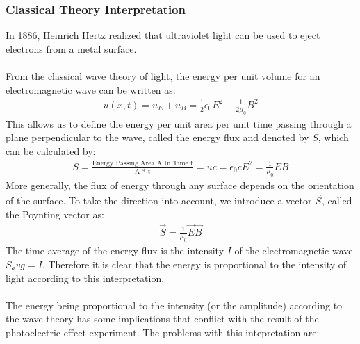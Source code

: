 		\subsubsection{Classical Theory Interpretation}
			In 1886, Heinrich Hertz realized that ultraviolet light can be used to eject electrons from a metal surface. 
			\\
			\\
			From the classical wave theory of light, the energy per unit volume for an electromagnetic wave can be written as:
			\begin{align*}
				u(x, t) = u_E + u_B = \frac{1}{2} \epsilon_0 E^2 + \frac{1}{2 \mu_0} B^2 
			\end{align*}
			This allows us to define the energy per unit area per unit time passing through a plane perpendicular to the wave, called the energy flux and denoted by $S$, which can be calculated by:
			\begin{align*}
				S = \frac{\text{Energy Passing Area A In Time t}}{\text{A * t}} = uc = \epsilon_0 c E^2 = \frac{1}{\mu_0} E B
			\end{align*}
			More generally, the flux of energy through any surface depends on the orientation of the surface. To take the direction into account, we introduce a vector $\vec{S}$, called the Poynting vector as:
			\begin{align*}
				\vec{S} = \frac{1}{\mu_0} \vec{E} \vec{B}
			\end{align*}
			The time average of the energy flux is the intensity $I$ of the electromagnetic wave $S_avg = I$. Therefore it is clear that the energy is proportional to the intensity of light according to this interpretation.
			\\
			\\
			The energy being proportional to the intensity (or the amplitude) according to the wave theory has some implications that conflict with the result of the photoelectric effect experiment. The problems with this intepretation are:
